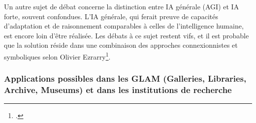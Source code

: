 \newline

Un autre sujet de débat concerne la distinction entre IA générale (AGI) et IA forte, souvent confondues. L’IA générale, qui ferait preuve de capacités d’adaptation et de raisonnement comparables à celles de l'intelligence humaine, est encore loin d’être réalisée. Les débats à ce sujet restent vifs, et il est probable que la solution réside dans une combinaison des approches connexionnistes et symboliques selon Olivier Ezrarry\footcite{ezratty_que_nodate}.

\subsubsection{Applications possibles dans les GLAM (Galleries, Libraries, Archive, Museums) et dans les institutions de recherche}

